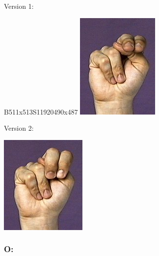 \documentclass{article}
\begin{document}
Version 1:

B511x513S11920490x487
\includegraphics[scale=0.5]{images/n1.jpg}

Version 2:

\includegraphics[scale=0.5]{images/n2.jpg}

\subsubsection{O:}
\end{document}
